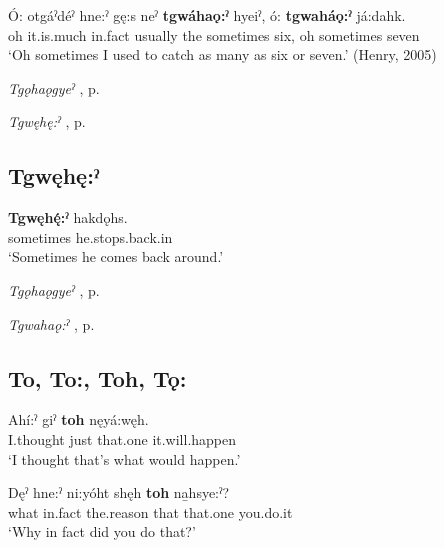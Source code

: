 \ea
\label{ex:tpart66}
\gll Ó: otgáˀdéˀ hne:ˀ gę:s neˀ \textbf{tgwáhaǫ:ˀ} hyeiˀ, ó: \textbf{tgwaháǫ:ˀ} já:dahk.\\
oh it.is.much in.fact usually the sometimes six, oh sometimes seven\\
\glt ‘Oh sometimes I used to catch as many as six or seven.’ (Henry, 2005)
\z

\begin{CayugaRelated}
\item \textit{Tgǫhaǫgyeˀ} , p. \pageref{p:[tgǫhaǫgyeˀ]}\\
\item \textit{Tgwęhę:ˀ} , p. \pageref{p:[tgwęhę:ˀ]}
\end{CayugaRelated}


\subsection*{\textbf{Tgwęhę:ˀ} } \label{p:[tgwęhę:ˀ]}

\ea
\label{ex:tpart67}
\gll \textbf{Tgwęhę́:ˀ} hakdǫhs.\\
sometimes he.stops.back.in\\
\glt ‘Sometimes he comes back around.’
\z

\begin{CayugaRelated}
\item \textit{Tgǫhaǫgyeˀ} , p. \pageref{p:[tgǫhaǫgyeˀ]}\\
\item \textit{Tgwahaǫ:ˀ} , p. \pageref{p:[tgwahaǫ:ˀ]}
\end{CayugaRelated}


\subsection*{\textbf{To, To:, Toh, Tǫ:} } \label{p:[to:] ‘that one’}

\ea
\label{ex:tpart68}
\gll Ahí:ˀ giˀ \textbf{toh} nęyá:węh.\\
I.thought just that.one it.will.happen\\
\glt ‘I thought that’s what would happen.’
\z

\ea
\label{ex:tpart69}
\gll Dęˀ hne:ˀ ni:yóht shęh \textbf{toh} na̱hsye:ˀ?\\
what in.fact the.reason that that.one you.do.it\\
\glt ‘Why in fact did you do that?’
\z

